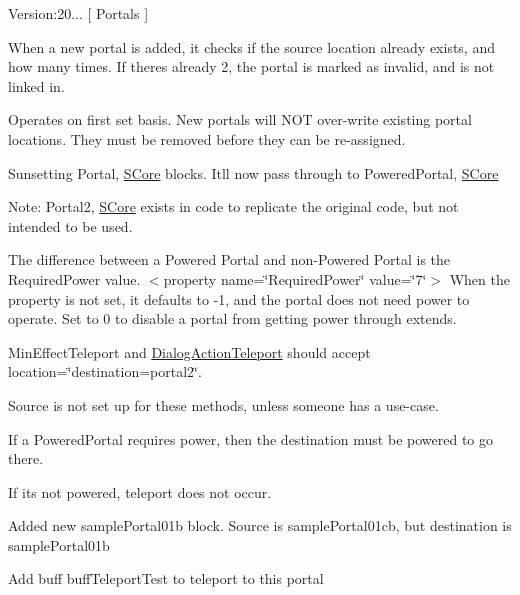 Version\+:20... \mbox{[} Portals \mbox{]}
\begin{DoxyItemize}
\item When a new portal is added, it checks if the source location already exists, and how many times. If there\textquotesingle{}s already 2, the portal is marked as invalid, and is not linked in.
\begin{DoxyItemize}
\item Operates on first set basis. New portals will NOT over-\/write existing portal locations. They must be removed before they can be re-\/assigned.
\end{DoxyItemize}
\item Sunsetting Portal, \mbox{\hyperlink{namespace_s_core}{SCore}} blocks. It\textquotesingle{}ll now pass through to Powered\+Portal, \mbox{\hyperlink{namespace_s_core}{SCore}}
\begin{DoxyItemize}
\item Note\+: Portal2, \mbox{\hyperlink{namespace_s_core}{SCore}} exists in code to replicate the original code, but not intended to be used.
\end{DoxyItemize}
\item The difference between a Powered Portal and non-\/\+Powered Portal is the Required\+Power value. $<$property name=\char`\"{}\+Required\+Power\char`\"{} value=\char`\"{}7\char`\"{}$>$ When the property is not set, it defaults to -\/1, and the portal does not need power to operate. Set to 0 to disable a portal from getting power through extends.
\end{DoxyItemize}

Min\+Effect\+Teleport and \mbox{\hyperlink{class_dialog_action_teleport}{Dialog\+Action\+Teleport}} should accept location=\char`\"{}destination=portal2\char`\"{}.
\begin{DoxyItemize}
\item Source is not set up for these methods, unless someone has a use-\/case.
\end{DoxyItemize}

If a Powered\+Portal requires power, then the destination must be powered to go there.
\begin{DoxyItemize}
\item If its not powered, teleport does not occur.
\end{DoxyItemize}

Added new sample\+Portal01b block. Source is sample\+Portal01cb, but destination is sample\+Portal01b
\begin{DoxyItemize}
\item Add buff buff\+Teleport\+Test to teleport to this portal
\end{DoxyItemize}

